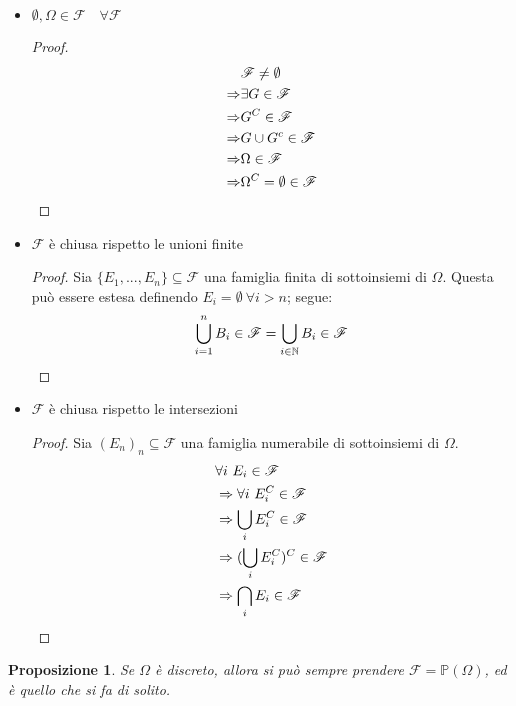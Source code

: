 \documentclass{article}
\theoremstyle{plain}
\newtheorem{proposizione}{Proposizione}[section]
\theoremstyle{definition}
\theoremstyle{remark}
\begin{document}
\begin{itemize}
	\item $\emptyset,\Omega\in\mathscr{F}\quad\forall\mathscr{F}$
	\begin{proof}
		\begin{align*}
			&\mathscr{F}\neq\emptyset\\
			\Rightarrow&\exists G\in\mathscr{F}\\
			\Rightarrow&G^C\in\mathscr{F}\\
			\Rightarrow&G\cup G^c \in\mathscr{F}\\
			\Rightarrow&\Omega\in\mathscr{F}\\
			\Rightarrow&\Omega^C=\emptyset\in\mathscr{F}\qedhere
		\end{align*}
	\end{proof}
	\item $\mathscr{F}$ è chiusa rispetto le unioni finite
	\begin{proof}
		Sia $\{E_1,...,E_n\}\subseteq\mathscr{F}$ una famiglia finita di sottoinsiemi di $\Omega$. Questa può essere estesa definendo $E_i=\emptyset\ \forall i>n$; segue:
		\begin{equation*}
			\bigcup_{i=1}^n B_i\in\mathscr{F}=\bigcup_{i\in\mathbb{N}} B_i\in\mathscr{F}\qedhere
		\end{equation*}
	\end{proof}
	\item $\mathscr{F}$ è chiusa rispetto le intersezioni
	\begin{proof}
		Sia $(E_n)_n\subseteq\mathscr{F}$ una famiglia numerabile di sottoinsiemi di $\Omega$.
		\begin{align*}
			 &\forall i\ E_i\in\mathscr{F}\\
			 &\Rightarrow\forall i\ E_i^C\in\mathscr{F}\\
			 &\Rightarrow\bigcup_i E_i^C\in\mathscr{F}\\
			 &\Rightarrow(\bigcup_i E_i^C)^C\in\mathscr{F}\\
			 &\Rightarrow\bigcap_i E_i\in\mathscr{F}\qedhere
		\end{align*}
	\end{proof}
\end{itemize}
\begin{proposizione}
	Se $\Omega$ è discreto, allora si può sempre prendere $\mathscr{F}=\mathds{P}(\Omega)$, ed è quello che si fa di solito.
\end{proposizione}
\end{document}
